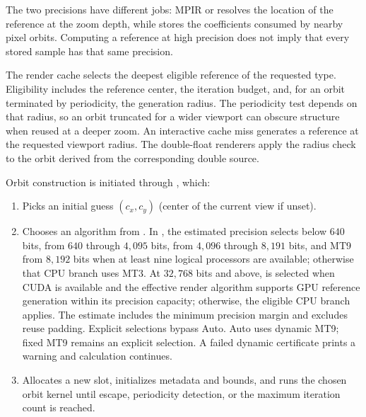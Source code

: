 The two precisions have different jobs: MPIR or  resolves
the location of the reference at the zoom depth, while  stores the
coefficients consumed by nearby pixel orbits.  Computing a reference at high
precision does not imply that every stored sample has that same precision.

The render cache selects the deepest eligible reference of the requested type.
Eligibility includes the reference center, the iteration budget, and, for an
orbit terminated by periodicity, the generation radius. The periodicity test
depends on that radius, so an orbit truncated for a wider viewport can obscure
structure when reused at a deeper zoom. An interactive cache miss generates a
reference at the requested viewport radius. The double-float renderers apply
the radius check to the orbit derived from the corresponding double source.

Orbit construction is initiated through , which:

\begin{enumerate}
  \item Picks an initial guess \((c_x,c_y)\) (center of the current view
        if unset).
  \item Chooses an algorithm from .  In
        , the estimated precision selects 
        below $640$ bits,  from $640$ through $4{,}095$ bits,
         from $4{,}096$ through
        $8{,}191$ bits, and MT9 from $8{,}192$ bits when at least nine logical
        processors are available; otherwise that CPU branch uses MT3. At $32{,}768$ bits and above,  is
        selected when CUDA is available and the effective render algorithm
        supports GPU reference generation within its precision capacity;
        otherwise, the eligible CPU branch applies. The estimate includes the minimum
        precision margin and excludes reuse padding. Explicit selections bypass Auto.
        Auto uses dynamic MT9; fixed MT9 remains an explicit selection. A failed
        dynamic certificate prints a warning and calculation continues.
  \item Allocates a new  slot, initializes
        metadata and bounds, and runs the chosen orbit kernel until escape,
        periodicity detection, or the maximum iteration count is reached.
\end{enumerate}

